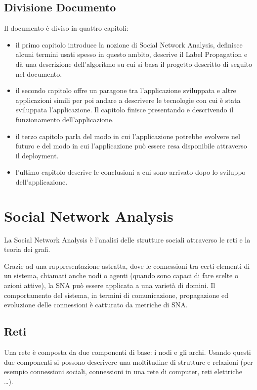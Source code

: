 \documentclass[a4paper,12pt]{report}
\begin{document}
\section{Divisione Documento}
Il documento è diviso in quattro capitoli:
\begin{itemize}
\item il primo capitolo introduce la nozione di Social Network Analysis, definisce alcuni termini usati spesso in questo ambito, descrive il Label Propagation e dà una descrizione dell'algoritmo su cui si basa il progetto descritto di seguito nel documento.

\item il secondo capitolo offre un paragone tra l'applicazione sviluppata e altre applicazioni simili per poi andare a descrivere le tecnologie con cui è stata sviluppata l'applicazione. Il capitolo finisce presentando e descrivendo il funzionamento dell'applicazione.

\item il terzo capitolo parla del modo in cui l'applicazione potrebbe evolvere nel futuro e del modo in cui l'applicazione può essere resa disponibile attraverso il deployment.

\item l'ultimo capitolo descrive le conclusioni a cui sono arrivato dopo lo sviluppo dell'applicazione.

\end{itemize}
%

\chapter{Social Network Analysis}
	La Social Network Analysis è l'analisi delle strutture sociali attraverso le reti e la teoria dei grafi. \cite{snaintro}
	
	Grazie ad una rappresentazione astratta, dove le connessioni tra certi elementi di un sistema, chiamati anche nodi o agenti (quando sono capaci di fare scelte o azioni attive), la SNA può essere applicata a una varietà di domini. Il comportamento del sistema, in termini di comunicazione, propagazione ed evoluzione delle connessioni è catturato da metriche di SNA. \cite{avpra}

	\section{Reti}
	Una rete è composta da due componenti di base: i nodi e gli archi. Usando questi due componenti si possono descrivere una moltitudine di strutture e relazioni (per esempio connessioni sociali, connessioni in una rete di computer, reti elettriche \dots). 
\end{document}
